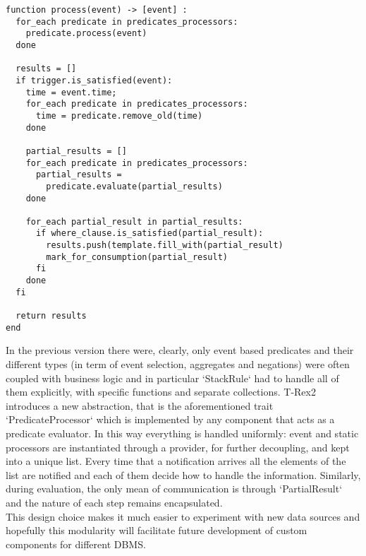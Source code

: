 \begin{minipage}{\textwidth}
\begin{lstlisting}[caption={RuleProcessor process method},label={lst:processmethod},xleftmargin=.05\textwidth]
function process(event) -> [event] :
  for_each predicate in predicates_processors:
    predicate.process(event)
  done

  results = []
  if trigger.is_satisfied(event):
    time = event.time;
    for_each predicate in predicates_processors:
      time = predicate.remove_old(time)
    done

    partial_results = []
    for_each predicate in predicates_processors:
      partial_results =
        predicate.evaluate(partial_results)
    done

    for_each partial_result in partial_results:
      if where_clause.is_satisfied(partial_result):
        results.push(template.fill_with(partial_result)
        mark_for_consumption(partial_result)
      fi
    done
  fi

  return results
end
\end{lstlisting}
\end{minipage}

In the previous version there were, clearly, only event based predicates and their different types (in term of event selection, aggregates and negations) were often coupled with business logic and in particular `StackRule` had to handle all of them explicitly, with specific functions and separate collections. T-Rex2 introduces a new abstraction, that is the aforementioned trait `PredicateProcessor` which is implemented by any component that acts as a predicate evaluator. In this way everything is handled uniformly: event and static processors are instantiated through a provider, for further decoupling, and kept into a unique list. Every time that a notification arrives all the elements of the list are notified and each of them decide how to handle the information. Similarly, during evaluation, the only mean of communication is through `PartialResult` and the nature of each step remains encapsulated.\\
This design choice makes it much easier to experiment with new data sources and hopefully this modularity will facilitate future development of custom components for different DBMS.


